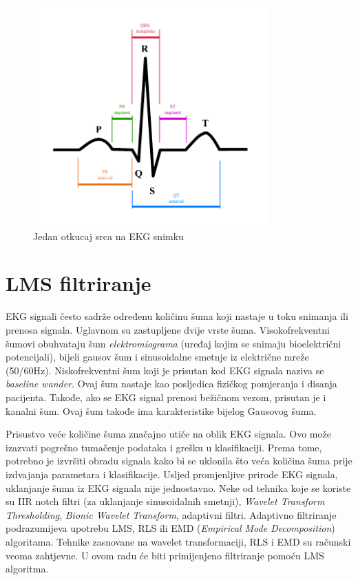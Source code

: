 \documentclass[12pt]{SeminarskiADS}
\begin{document}



\begin{figure}[h]
\centering
\includegraphics[width=0.8\textwidth]{ecg_otkucaj}
\caption{Jedan otkucaj srca na EKG snimku}
\label{ecg_otkucaj}
\end{figure}


\section{LMS filtriranje}
\label{sec:lms}

EKG signali često sadrže određenu količinu šuma koji nastaje u toku snimanja ili prenosa signala. Uglavnom su zastupljene dvije vrste šuma. Visokofrekventni šumovi obuhvataju šum \emph{elektromiograma} (uređaj kojim se snimaju bioelektrični potencijali), bijeli gausov šum i sinusoidalne smetnje iz električne mreže (50/60Hz). Niskofrekventni šum koji je prisutan kod EKG signala naziva se \emph{baseline wander}. Ovaj šum nastaje kao posljedica fizičkog pomjeranja i disanja pacijenta. Takođe, ako se EKG signal prenosi bežičnom vezom, prisutan je i kanalni šum. Ovaj šum takođe ima karakteristike bijelog Gausovog šuma. 

Prisustvo veće količine šuma značajno utiče na oblik EKG signala. Ovo može izazvati pogrešno tumačenje podataka i grešku u klasifikaciji. Prema tome, potrebno je izvršiti obradu signala kako bi se uklonila što veća količina šuma prije izdvajanja parametara i klasifikacije. Usljed promjenljive prirode EKG signala, uklanjanje šuma iz EKG signala nije jednostavno. Neke od tehnika koje se koriste su IIR notch filtri (za uklanjanje sinusoidalnih smetnji), \emph{Wavelet Transform Thresholding}, \emph{Bionic Wavelet Transform}, adaptivni filtri. Adaptivno filtriranje podrazumijeva upotrebu LMS, RLS ili EMD (\emph{Empirical Mode Decomposition}) algoritama. Tehnike zasnovane na wavelet transformaciji, RLS i EMD su računski veoma zahtjevne. U ovom radu će biti primijenjeno filtriranje pomoću LMS algoritma.
\end{document}
